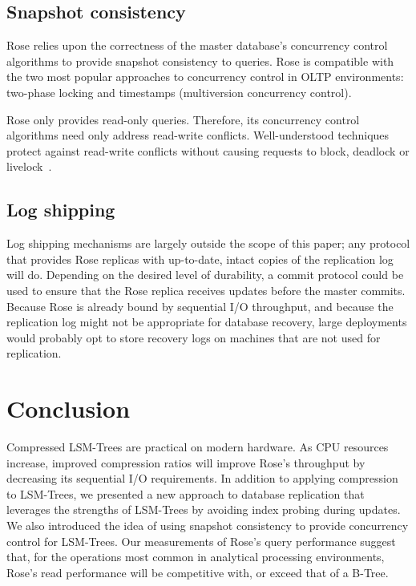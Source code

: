 \documentclass{vldb}
\newcommand{\rows}{Rose\xspace}
\newcommand{\rowss}{Rose's\xspace}
\begin{document}
\subsection{Snapshot consistency}

\rows relies upon the correctness of the master database's concurrency
control algorithms to provide snapshot consistency to queries.  \rows
is compatible with the two most popular approaches to concurrency
control in OLTP environments: two-phase locking and timestamps
(multiversion concurrency control).

\rows only provides read-only queries.  Therefore, its concurrency
control algorithms need only address read-write conflicts.
Well-understood techniques protect against read-write conflicts
without causing requests to block, deadlock or
livelock~\cite{concurrencyControl}.

\subsection{Log shipping}

Log shipping mechanisms are largely outside the scope of this paper;
any protocol that provides \rows replicas with up-to-date, intact
copies of the replication log will do.  Depending on the desired level
of durability, a commit protocol could be used to ensure that the
\rows replica receives updates before the master commits.  Because
\rows is already bound by sequential I/O throughput, and because the
replication log might not be appropriate for database recovery, large
deployments would probably opt to store recovery logs on machines
that are not used for replication.

\section{Conclusion}

Compressed LSM-Trees are practical on modern hardware.  As CPU
resources increase, improved compression ratios will improve \rowss
throughput by decreasing its sequential I/O requirements.  In addition
to applying compression to LSM-Trees, we presented a new approach to
database replication that leverages the strengths of LSM-Trees by
avoiding index probing during updates.  We also introduced the idea of
using snapshot consistency to provide concurrency control for
LSM-Trees.  Our measurements of \rowss query performance suggest that,
for the operations most common in analytical processing environments,
\rowss read performance will be competitive with, or exceed that of a
B-Tree.
\end{document}

